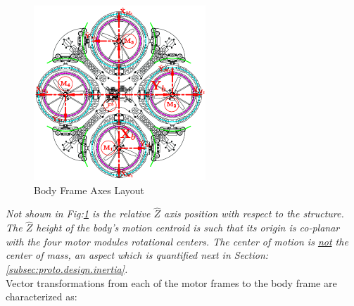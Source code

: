 \begin{figure}[htbp]
\centering
\includegraphics[width=\textwidth]{figs/body-frame}
\caption{Body Frame Axes Layout}
\label{fig:body-frame}
\end{figure}
\par
\emph{\color{Gray}Not shown in Fig:\ref{fig:body-frame} is the relative $\hat{Z}$ axis position with respect to the structure. The $\hat{Z}$ height of the body's motion centroid is such that its origin is co-planar with the four motor modules rotational centers. The center of motion is \underline{not} the center of mass, an aspect which is quantified next in Section:\ref{subsec:proto.design.inertia}.}
\\
Vector transformations from each of the motor frames to the body frame are characterized as:
